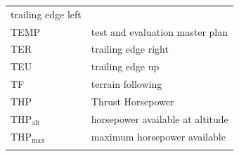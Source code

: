 \documentclass[
]{book}
\begin{document}
\begin{longtable}[]{@{}ll@{}}
\begin{minipage}[t]{0.47\columnwidth}
trailing edge left\strut
\end{minipage}\tabularnewline
\begin{minipage}[t]{0.47\columnwidth}\raggedright
TEMP\strut
\end{minipage} & \begin{minipage}[t]{0.47\columnwidth}\raggedright
test and evaluation master plan\strut
\end{minipage}\tabularnewline
\begin{minipage}[t]{0.47\columnwidth}\raggedright
TER\strut
\end{minipage} & \begin{minipage}[t]{0.47\columnwidth}\raggedright
trailing edge right\strut
\end{minipage}\tabularnewline
\begin{minipage}[t]{0.47\columnwidth}\raggedright
TEU\strut
\end{minipage} & \begin{minipage}[t]{0.47\columnwidth}\raggedright
trailing edge up\strut
\end{minipage}\tabularnewline
\begin{minipage}[t]{0.47\columnwidth}\raggedright
TF\strut
\end{minipage} & \begin{minipage}[t]{0.47\columnwidth}\raggedright
terrain following\strut
\end{minipage}\tabularnewline
\begin{minipage}[t]{0.47\columnwidth}\raggedright
\({\mathrm{THP}}\)\strut
\end{minipage} & \begin{minipage}[t]{0.47\columnwidth}\raggedright
Thrust Horsepower\strut
\end{minipage}\tabularnewline
\begin{minipage}[t]{0.47\columnwidth}\raggedright
\({\mathrm{THP}}_{\mathrm{alt}}\)\strut
\end{minipage} & \begin{minipage}[t]{0.47\columnwidth}\raggedright
horsepower available at altitude\strut
\end{minipage}\tabularnewline
\begin{minipage}[t]{0.47\columnwidth}\raggedright
\({\mathrm{THP}}_{\mathrm{max}}\)\strut
\end{minipage} & \begin{minipage}[t]{0.47\columnwidth}\raggedright
maximum horsepower available\strut
\end{minipage}\tabularnewline
\begin{minipage}[t]{0.47\columnwidth}\raggedright

\end{minipage}
\end{longtable}
\end{document}
